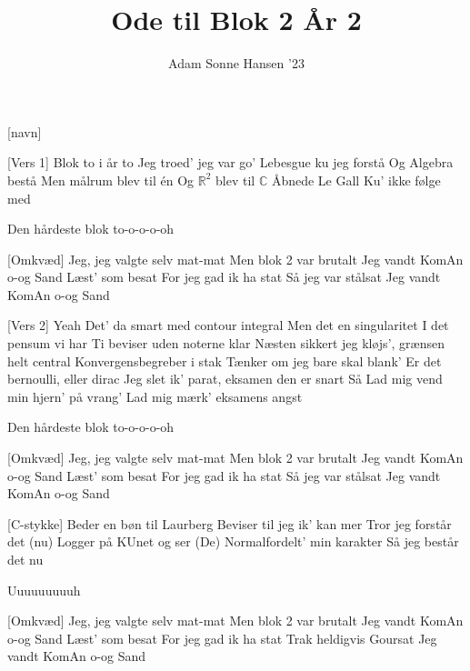\documentclass[a4paper,11pt]{article}
\title{Ode til Blok 2 År 2}
\author{Adam Sonne Hansen '23}
\begin{document}
\maketitle

\begin{roles}
[navn]
\end{roles}



\begin{song}
  \sings{}[Vers 1]
Blok to i år to
Jeg troed' jeg var go'
Lebesgue ku jeg forstå
Og Algebra bestå
Men målrum blev til én
Og $\mathbb{R}^2$ blev til $\mathbb{C}$
Åbnede Le Gall
Ku' ikke følge med

Den hårdeste blok to-o-o-o-oh

\sings{}[Omkvæd]
Jeg, jeg valgte selv mat-mat
Men blok 2 var brutalt
Jeg vandt KomAn o-og Sand 
Læst' som besat
For jeg gad ik ha stat
Så jeg var stålsat
Jeg vandt KomAn o-og Sand 

  \sings{}[Vers 2]
Yeah
Det' da smart med contour integral
Men det en singularitet I det pensum vi har
Ti beviser uden noterne klar
Næsten sikkert jeg kløjs', grænsen helt central
Konvergensbegreber i stak
Tænker om jeg bare skal blank'
Er det bernoulli, eller dirac
Jeg slet ik' parat, eksamen den er snart
Så
Lad mig vend min hjern' på vrang'
Lad mig mærk' eksamens angst

Den hårdeste blok to-o-o-o-oh

\sings{}[Omkvæd]
Jeg, jeg valgte selv mat-mat
Men blok 2 var brutalt
Jeg vandt KomAn o-og Sand 
Læst' som besat
For jeg gad ik ha stat
Så jeg var stålsat
Jeg vandt KomAn o-og Sand 

\sings{}[C-stykke]
 Beder en bøn til Laurberg
Beviser til jeg ik' kan mer
Tror jeg forstår det (nu)
Logger på KUnet og ser
(De) Normalfordelt' min karakter
Så jeg består det nu

Uuuuuuuuuh


\sings{}[Omkvæd]
Jeg, jeg valgte selv mat-mat
Men blok 2 var brutalt
Jeg vandt KomAn o-og Sand 
Læst' som besat
For jeg gad ik ha stat
Trak heldigvis Goursat
Jeg vandt KomAn o-og Sand 
\end{song}
\end{document}
